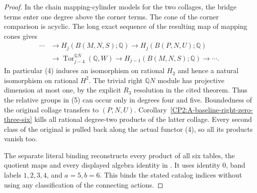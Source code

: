\begin{proof}
In the chain mapping-cylinder models for the two collages,
the bridge terms enter one degree above the corner terms.
The cone of the corner comparison is acyclic.  The long
exact sequence of the resulting map of mapping cones gives
\[
 \begin{aligned}
 \cdots&\longrightarrow H_j(B(M,N,S);\mathbb Q)
 \longrightarrow H_j(B(P,N,U);\mathbb Q)\\
 &\longrightarrow\operatorname{Tor}^{\mathbb QN}_{j-4}(\mathbb Q,W)
 \longrightarrow H_{j-1}(B(M,N,S);\mathbb Q)
 \longrightarrow\cdots .
 \end{aligned}                                           \tag{5}
\]
In particular (4) induces an isomorphism on rational
$H_2$ and hence a natural isomorphism on rational $H^2$.
The trivial right $\mathbb QN$ module has projective
dimension at most one, by the explicit $R_3$ resolution
in the cited theorem.  Thus the relative groups in (5)
can occur only in degrees four and five.  Boundedness of
the original collage transfers to $(P,N,U)$.
Corollary~\ref{CP2:A-baseline-right-zero-three-six} kills
all rational degree-two products of the latter collage.
Every second class of the original is pulled back along
the actual functor (4), so all its products vanish too.

The separate literal binding reconstructs every product
of all six tables, the quotient maps and every displayed
algebra identity in
.
It uses identity $0$, band labels $1,2,3,4$, and $a=5,b=6$.
This binds the stated catalog indices without using any
classification of the connecting actions.
\end{proof}
